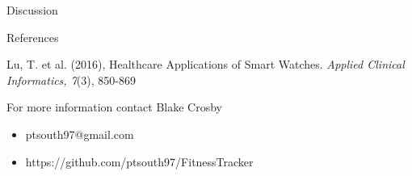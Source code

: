 \documentclass[final]{beamer}
\newlength{\onecolwid}
\begin{document}
\begin{frame}[t]
\begin{columns}[t]
\begin{column}{\onecolwid}
\begin{alertblock}{Discussion}
\end{alertblock}



\begin{alertblock}{References}
	
	\begin{hangparas}{.5in}{1}
		
		Lu, T. et al. (2016), Healthcare Applications of Smart Watches. \textit{Applied Clinical Informatics, 7}(3), 850-869
		
	\end{hangparas}
	
\end{alertblock}


\begin{alertblock}{For more information contact Blake Crosby}

\begin{itemize}
	\item ptsouth97@gmail.com
	\item https://github.com/ptsouth97/FitnessTracker
\end{itemize}

\end{alertblock}



\end{column} %

\end{columns} %

\end{frame} %
\end{document}
